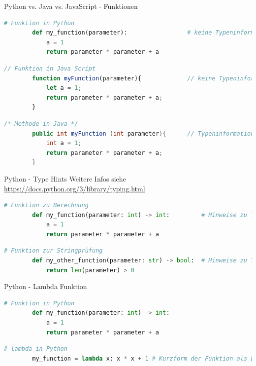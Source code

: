 \begin{frame}[fragile]{Python vs. Java vs. JavaScript - Funktionen}
    \begin{lstlisting}[language=Python, gobble=8]
        # Funktion in Python
        def my_function(parameter):                 # keine Typeninformation
            a = 1
            return parameter * parameter + a
    \end{lstlisting}
    \begin{lstlisting}[language=JavaScript, gobble=8]
        // Funktion in Java Script
        function myFunction(parameter){             // keine Typeninformation
            let a = 1;
            return parameter * parameter + a;
        }
    \end{lstlisting}
    \begin{lstlisting}[language=Java, gobble=8]
        /* Methode in Java */
        public int myFunction (int parameter){      // Typeninformation
            int a = 1;
            return parameter * parameter + a;
        }
        \end{lstlisting}
\end{frame}

\begin{frame}[fragile]{Python - Type Hints}
    Weitere Infos siehe \url{https://docs.python.org/3/library/typing.html}

    \begin{lstlisting}[language=Python, gobble=8]
        # Funktion zu Berechnung
        def my_function(parameter: int) -> int:         # Hinweise zu Typen
            a = 1
            return parameter * parameter + a
    \end{lstlisting}
	
	\begin{lstlisting}[language=Python, gobble=8]
        # Funktion zur Stringprüfung
        def my_other_function(parameter: str) -> bool:  # Hinweise zu Typen
            return len(parameter) > 0
    \end{lstlisting}
   
\end{frame}

\begin{frame}[fragile]{Python - Lambda Funktion}

    \begin{lstlisting}[language=Python, gobble=8]
        # Funktion in Python
        def my_function(parameter: int) -> int:
            a = 1
            return parameter * parameter + a
    \end{lstlisting}
	
    \begin{lstlisting}[language=Python, gobble=8]
        # lambda in Python
        my_function = lambda x: x * x + 1 # Kurzform der Funktion als Lambda
    \end{lstlisting}
   
\end{frame}

